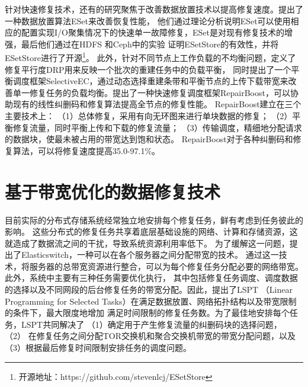 针对快速修复技术，还有的研究聚焦于改善数据放置技术以提高修复速度。\citet{liu2020esetstore}提出了一种数据放置算法ESet来改善恢复性能，
他们通过理论分析说明ESet可以使用相应的配置实现I/O聚集情况下的快速单一故障修复，ESet是对现有修复技术的增强，最后他们通过在HDFS\cite{borthakur2008hdfs}
和Ceph\cite{weil2006ceph}中的实验
证明ESetStore的有效性，并将ESetStore进行了开源\footnote{开源地址：https://github.com/stevenlcj/ESetStore}。
此外，\citet{xu2020selectiveec}针对不同节点上工作负载的不均衡问题，定义了修复平行度DRP用来反映一个批次的重建任务中的负载平衡，
同时提出了一个平衡调度框架SelectiveEC，通过动态选择重建条带和平衡节点的上传下载带宽来改善单一修复任务的负载均衡。\citet{lin2021boosting}提出了一种快速修复调度框架RepairBoost，可以协助现有的线性纠删码和修复算法提高全节点的修复性能。
RepairBoost建立在三个主要技术上：
（1）总体修复，采用有向无环图来进行单块数据的修复；
（2）平衡修复流量，同时平衡上传和下载的修复流量；
（3）传输调度，精细地分配请求的数据块，使最未被占用的带宽达到饱和状态。
RepairBoost对于各种纠删码和修复算法，可以将修复速度提高35.0-97.1\%。

\section{基于带宽优化的数据修复技术}

目前实际的分布式存储系统经常独立地安排每个修复任务，鲜有考虑到任务彼此的影响。
这些分布式的修复任务共享着底层基础设施的网络、计算和存储资源，这就造成了数据流之间的干扰，导致系统资源利用率低下。
为了缓解这一问题，\citet{popa2013elasticswitch}提出了Elasticswitch，一种可以在各个服务器之间分配带宽的技术。
通过这一技术，将服务器的总带宽资源进行整合，可以为每个修复任务分配必要的网络带宽。此外，系统中主要有三种任务需要优化执行，
其中包括修复任务调度、调度数据的选择以及不同网段的后台修复任务的带宽分配。因此，\citet{li2018joint}提出了LSPT
（Linear Programming for Selected Tasks）在满足数据放置、网络拓扑结构以及带宽限制的条件下，最大限度地增加
满足时间限制的修复任务数。为了最佳地安排每个任务，LSPT共同解决了
（1）确定用于产生修复流量的纠删码块的选择问题，
（2） 在修复任务之间分配TOR交换机和聚合交换机带宽的带宽分配问题，以及
（3）根据最后修复时间限制安排任务的调度问题。

